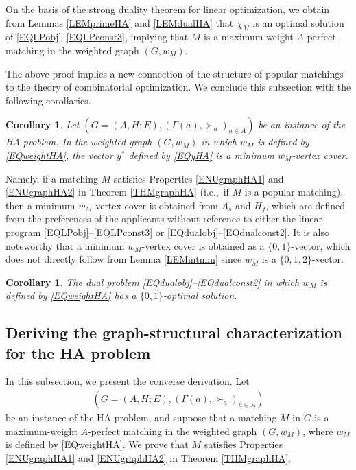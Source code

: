 \documentclass[11pt,a4paper,showkeys]{article}
\theoremstyle{plain}
\newtheorem{corollary}[theorem]{Corollary}
\theoremstyle{definition}
\begin{document}
On the basis of the strong duality theorem for linear optimization, 
we obtain from Lemmas \ref{LEMprimeHA} and \ref{LEMdualHA} that 
$\chi_M$ is an optimal solution of \eqref{EQLPobj}--\eqref{EQLPconst3}, 
implying that $M$ is a maximum-weight $A$-perfect matching in the weighted graph $(G,w_M)$. 



The above proof implies a new connection of the structure of popular matchings to the theory of combinatorial optimization. 
We conclude this subsection with the following corollaries. 

\begin{corollary}
    \label{CORwcoverHA}
    Let $(G=(A,H;E),(\Gamma(a),\succ_a)_{a\in A})$ be an instance of the HA problem. 
    In the weighted graph $(G,w_M)$ 
    in which $w_M$ is defined by \eqref{EQweightHA}, 
    the vector $y^*$ defined by \eqref{EQyHA} is a minimum $w_M$-vertex cover. 
\end{corollary}

Namely, 
if a matching $M$ satisfies Properties \ref{ENUgraphHA1} and \ref{ENUgraphHA2} in Theorem \ref{THMgraphHA} 
(i.e.,\ if $M$ is a popular matching), 
then 
a minimum $w_M$-vertex cover is obtained from $A_s$ and $H_f$, 
which are defined from the preferences of the applicants 
without reference to either the linear program \eqref{EQLPobj}--\eqref{EQLPconst3} or \eqref{EQdualobj}--\eqref{EQdualconst2}.
It is also noteworthy that a minimum $w_M$-vertex cover is obtained as a $\{0,1\}$-vector, 
which does not directly follow from Lemma \ref{LEMintmm} since 
$w_M$ is a $\{0,1,2\}$-vector. 

\begin{corollary}
    \label{CORHA}
    The dual problem \eqref{EQdualobj}--\eqref{EQdualconst2} in which $w_M$ is defined by \eqref{EQweightHA} has a $\{0,1\}$-optimal solution. 
\end{corollary}

\subsection{Deriving the graph-structural characterization for the HA problem}
\label{SECHA2}

In this subsection, 
we present the converse derivation. 
Let 
\begin{align*}
(G=(A,H;E),(\Gamma(a),\succ_a)_{a\in A})    
\end{align*} 
be an instance of the HA problem, 
and 
suppose that a matching $M$ in $G$ is a maximum-weight $A$-perfect matching in the weighted graph $(G,w_M)$, 
where $w_M$ is defined by \eqref{EQweightHA}. 
We prove that $M$ satisfies Properties \ref{ENUgraphHA1} and \ref{ENUgraphHA2} in Theorem \ref{THMgraphHA}. 
\end{document}
